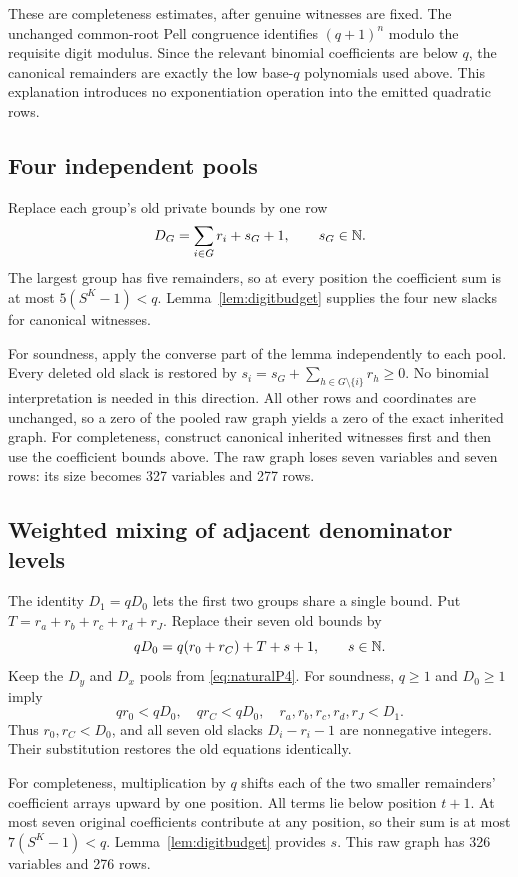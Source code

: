 These are completeness estimates, after genuine witnesses are fixed.
The unchanged common-root Pell congruence identifies $(q+1)^n$ modulo
the requisite digit modulus. Since the relevant binomial coefficients
are below $q$, the canonical remainders are exactly the low base-$q$
polynomials used above. This explanation introduces no exponentiation
operation into the emitted quadratic rows.

\subsection{Four independent pools}
Replace each group's old private bounds by one row
\begin{equation}\label{eq:naturalP4}
 D_G=\sum_{i\in G}r_i+s_G+1,\qquad s_G\in\mathbb N.
\end{equation}
The largest group has five remainders, so at every position the coefficient
sum is at most $5(S^K-1)<q$. Lemma~\ref{lem:digitbudget} supplies the four
new slacks for canonical witnesses.

For soundness, apply the converse part of the lemma independently to
each pool. Every deleted old slack is restored by
$s_i=s_G+\sum_{h\in G\setminus\{i\}}r_h\ge0$.
No binomial interpretation is needed in this direction. All other rows
and coordinates are unchanged, so a zero of the pooled raw graph yields a
zero of the exact inherited graph. For completeness, construct canonical
inherited witnesses first and then use the coefficient bounds above.
The raw graph loses seven variables and seven rows: its size becomes
327 variables and 277 rows.

\subsection{Weighted mixing of adjacent denominator levels}
The identity $D_1=qD_0$ lets the first two groups share a single bound.
Put $T=r_a+r_b+r_c+r_d+r_J$. Replace their seven old bounds by
\begin{equation}\label{eq:naturalP3}
 qD_0=q(r_0+r_C)+T+s+1,\qquad s\in\mathbb N.
\end{equation}
Keep the $D_y$ and $D_x$ pools from \eqref{eq:naturalP4}.
For soundness, $q\ge1$ and $D_0\ge1$ imply
\[
 qr_0<qD_0,\quad qr_C<qD_0,\quad
 r_a,r_b,r_c,r_d,r_J<D_1.
\]
Thus $r_0,r_C<D_0$, and all seven old slacks
$D_i-r_i-1$ are nonnegative integers. Their substitution restores the
old equations identically.

For completeness, multiplication by $q$ shifts each of the two smaller
remainders' coefficient arrays upward by one position. All terms lie below
position $t+1$. At most seven original coefficients contribute at any
position, so their sum is at most $7(S^K-1)<q$.
Lemma~\ref{lem:digitbudget} provides $s$. This raw graph has
326 variables and 276 rows.

